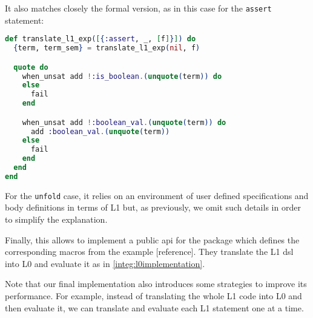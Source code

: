 It also matches closely the formal version, as in this case for the 
\verb|assert| statement:

\begin{lstlisting}[language=elixir,numbers=none,frame=none]
def translate_l1_exp([{:assert, _, [f]}]) do
  {term, term_sem} = translate_l1_exp(nil, f)

  quote do
    when_unsat add !:is_boolean.(unquote(term)) do
    else
      fail
    end

    when_unsat add !:boolean_val.(unquote(term)) do
      add :boolean_val.(unquote(term))
    else
      fail
    end
  end
end
\end{lstlisting}

For the \verb|unfold| case, it relies on an environment of user defined specifications
and body definitions in terms of L1 but, as previously, we omit such details in order 
to simplify the explanation.

Finally, this allows to implement a public \gls{api} for the package which defines 
the corresponding macros from the example [reference]. They translate the L1 \gls{dsl} 
into L0 and evaluate it as in \ref{integ:l0implementation}.

Note that our final implementation also introduces some strategies to improve its 
performance. For example, instead of translating the whole L1 code into L0 and then 
evaluate it, we can translate and evaluate each L1 statement one at a time.

